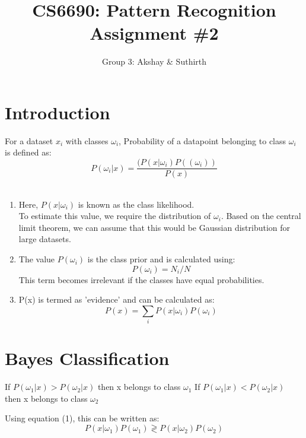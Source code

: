 \documentclass[11pt,a4paper]{article}
\begin{document}
\title{CS6690: Pattern Recognition Assignment \#2}
\author{Group 3: Akshay \& Suthirth}
\maketitle

\newpage

\section{Introduction}
For a dataset $x_i$ with classes $\omega_i$, 
Probability of a datapoint belonging to class $\omega_i$ is defined as: \\
\begin{equation}
P(\omega_i | x) = \frac{(P(x|\omega_i)P((\omega_i))}{P(x)}
\end{equation}
\\ 

\begin{enumerate}

	\item Here, $P(x|\omega_i)$ is known as the class likelihood. 
\\ To estimate this value, we require the distribution of $\omega_i$.
Based on the central limit theorem, we can assume that this would be Gaussian distribution for large datasets. 

	\item The value $P(\omega_i)$ is the class prior and is calculated using:
		\begin{equation}
		P(\omega_i) = N_i / N  
		\end{equation}
	This term becomes irrelevant if the classes have equal probabilities. 

	\item P(x) is termed as 'evidence' and can be calculated as:
	\begin{equation}
	{P(x) = \sum_i P(x | \omega_i)P(\omega_i)}
	\end{equation}
\end{enumerate}

\section{Bayes Classification}

If $P(\omega_1 | x) > P(\omega_2 | x)$ then x belongs to class $\omega_1$
If $P(\omega_1 | x) < P(\omega_2 | x)$ then x belongs to class $\omega_2$

Using equation (1), this can be written as:
 \begin{equation}
 {P(x| \omega_1)P(\omega_1) \gtrless P(x | \omega_2)P(\omega_2)}
 \end{equation}
\end{document}
